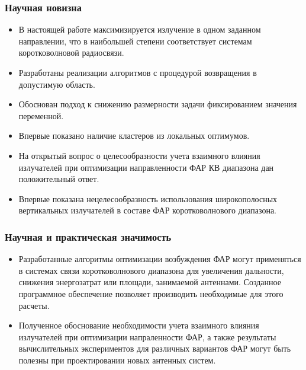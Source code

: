 \begin{frame}
    \frametitle{Научная новизна}
    \begin{itemize}

    \item В настоящей работе максимизируется излучение в одном заданном направлении, что в наибольшей степени соответствует системам коротковолновой радиосвязи.
    \item Разработаны реализации алгоритмов с процедурой возвращения в допустимую область.
    \item Обоснован подход к снижению размерности задачи фиксированием значения переменной.
    \item Впервые показано наличие кластеров из локальных оптимумов.
    \item На открытый вопрос о целесообразности учета взаимного влияния излучателей при оптимизации направленности ФАР КВ диапазона дан положительный ответ.
    \item Впервые показана нецелесообразность использования широкополосных вертикальных излучателей в составе ФАР коротковолнового диапазона.
    \end{itemize}
\end{frame}

\begin{frame}
    \frametitle{Научная и практическая значимость}
    \begin{itemize}
        \item Разработанные алгоритмы оптимизации возбуждения ФАР могут  применяться в системах связи коротковолнового диапазона для увеличения дальности, снижения энергозатрат или площади, занимаемой антеннами. Созданное программное обеспечение позволяет производить необходимые для этого расчеты.
        \item Полученное обоснование необходимости учета взаимного влияния излучателей при оптимизации напраленности ФАР, а также результаты вычислительных экспериментов для различных вариантов ФАР могут быть полезны при проектировании новых антенных систем.

    \end{itemize}
\end{frame}


